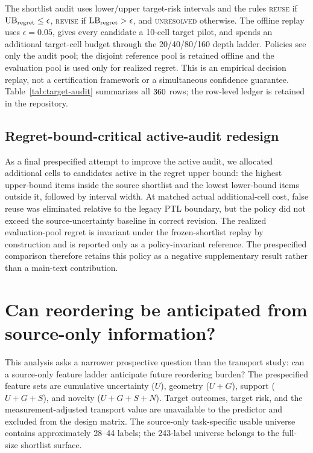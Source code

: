 \documentclass{article}
\begin{document}


The shortlist audit uses lower/upper target-risk intervals and the rules
\textsc{reuse} if $\mathrm{UB}_{\rm regret}\leq\epsilon$, \textsc{revise} if
$\mathrm{LB}_{\rm regret}>\epsilon$, and \textsc{unresolved} otherwise. The
offline replay uses $\epsilon=0.05$, gives every candidate a 10-cell target
pilot, and spends an additional target-cell budget through the 20/40/80/160
depth ladder. Policies see only the audit pool; the disjoint reference pool is
retained offline and the evaluation pool is used only for realized regret.
This is an empirical decision replay, not a certification framework or a
simultaneous confidence guarantee. Table~\ref{tab:target-audit} summarizes all
$360$ rows; the row-level ledger is retained in the repository.



\subsection{Regret-bound-critical active-audit redesign}

As a final prespecified attempt to improve the active audit, we allocated
additional cells to candidates active in the regret upper bound: the highest
upper-bound items inside the source shortlist and the lowest lower-bound items
outside it, followed by interval width. At matched actual additional-cell
cost, false reuse was eliminated relative to the legacy PTL boundary, but the
policy did not exceed the source-uncertainty baseline in correct revision. The
realized evaluation-pool regret is invariant under the frozen-shortlist replay
by construction and is reported only as a policy-invariant reference. The
prespecified comparison therefore retains this policy as a negative supplementary result
rather than a main-text contribution.



\section{Can reordering be anticipated from source-only information?}
\label{app:prospective}

This analysis asks a narrower prospective question than the transport study: can a source-only feature ladder anticipate future reordering burden? The prespecified feature sets are cumulative uncertainty ($U$), geometry ($U+G$), support ($U+G+S$), and novelty ($U+G+S+N$). Target outcomes, target risk, and the measurement-adjusted transport value are unavailable to the predictor and excluded from the design matrix. The source-only task-specific usable universe contains approximately 28--44 labels; the 243-label universe belongs to the full-size shortlist surface.
\end{document}
